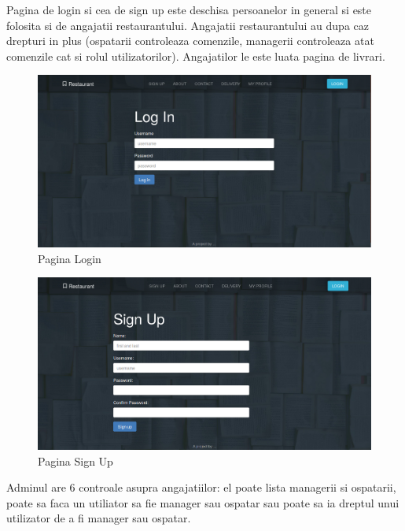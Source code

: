 \documentclass[12pt,english]{article}
\begin{document}
\begin{flushleft}
Pagina de login si cea de sign up este deschisa persoanelor in general si este folosita si de angajatii restaurantului. Angajatii restaurantului au dupa caz drepturi in plus (ospatarii controleaza comenzile, managerii controleaza atat comenzile cat si rolul utilizatorilor). Angajatilor le este luata pagina de livrari.
\end{flushleft}

\begin{figure}[H]
\includegraphics[width=1\textwidth]{login.png}
\caption{Pagina Login}
\end{figure}

\begin{figure}[H]
\includegraphics[width=1\textwidth]{sign_up.png}
\caption{Pagina Sign Up}
\end{figure}

\begin{flushleft}
Adminul are 6 controale asupra angajatiilor: el poate lista managerii si ospatarii,
poate sa faca un utiliator sa fie manager sau ospatar sau poate sa ia dreptul unui utilizator de a fi manager sau ospatar. 
\end{flushleft}
\end{document}
